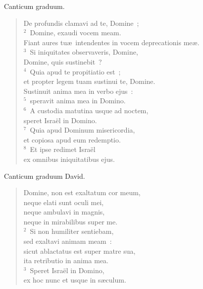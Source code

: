 \lettrine[lines=3,image=true,loversize=0.05,lraise=-0.03]{C}{}anticum graduum. \begin{flushleft}\begin{verse}\vspace{6pt}De profundis clamavi ad te, Domine~;\\
${}^{2}$~Domine, exaudi vocem meam.\\ Fiant aures tu\ae\ intendentes in vocem deprecationis me\ae .\\
${}^{3}$~Si iniquitates observaveris, Domine,\\ Domine, quis sustinebit~?\\
${}^{4}$~Quia apud te propitiatio est~;\\ et propter legem tuam sustinui te, Domine.\\ Sustinuit anima mea in verbo ejus~:\\
${}^{5}$~speravit anima mea in Domino.\\
${}^{6}$~A custodia matutina usque ad noctem,\\ speret Isra\"el in Domino.\\
${}^{7}$~Quia apud Dominum misericordia,\\ et copiosa apud eum redemptio.\\
${}^{8}$~Et ipse redimet Isra\"el\\ ex omnibus iniquitatibus ejus.\end{verse}\end{flushleft}



\lettrine[lines=3,image=true,loversize=0.05,lraise=-0.03]{C}{}anticum graduum David. \begin{flushleft}\begin{verse}\vspace{6pt}Domine, non est exaltatum cor meum,\\ neque elati sunt oculi mei,\\ neque ambulavi in magnis,\\ neque in mirabilibus super me.\\
${}^{2}$~Si non humiliter sentiebam,\\ sed exaltavi animam meam~:\\ sicut ablactatus est super matre sua,\\ ita retributio in anima mea.\\
${}^{3}$~Speret Isra\"el in Domino,\\ ex hoc nunc et usque in s\ae culum.\end{verse}\end{flushleft}



